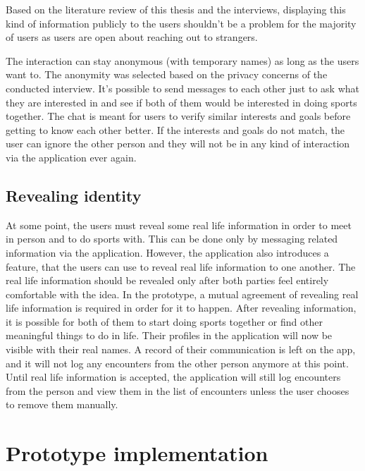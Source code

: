 Based on the literature review of this thesis and the interviews, displaying this kind of information publicly to the users shouldn't be a problem for the majority of users as users are open about reaching out to strangers.

The interaction can stay anonymous (with temporary names) as long as the users want to. The anonymity was selected based on the privacy concerns of the conducted interview. It's possible to send messages to each other just to ask what they are interested in and see if both of them would be interested in doing sports together. The chat is meant for users to verify similar interests and goals before getting to know each other better. If the interests and goals do not match, the user can ignore the other person and they will not be in any kind of interaction via the application ever again.

\subsection{Revealing identity}

At some point, the users must reveal some real life information in order to meet in person and to do sports with. This can be done only by messaging related information via the application. However, the application also introduces a feature, that the users can use to reveal real life information to one another. The real life information should be revealed only after both parties feel entirely comfortable with the idea. In the prototype, a mutual agreement of revealing real life information is required in order for it to happen. After revealing information, it is possible for both of them to start doing sports together or find other meaningful things to do in life. Their profiles in the application will now be visible with their real names. A record of their communication is left on the app, and it will not log any encounters from the other person anymore at this point. Until real life information is accepted, the application will still log encounters from the person and view them in the list of encounters unless the user chooses to remove them manually.

\section{Prototype implementation}

